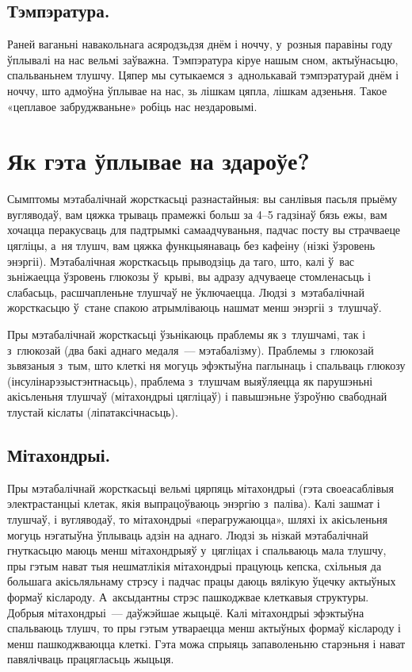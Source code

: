 
\subsection{Тэмпэратура.}
Раней ваганьні навакольнага асяродзьдзя днём і ноччу, у~розныя паравіны году ўплывалі на нас вельмі заўважна. Тэмпэратура кіруе нашым сном, актыўнасьцю, спальваньнем тлушчу. Цяпер мы сутыкаемся з~аднолькавай тэмпэратурай днём і ноччу, што адмоўна ўплывае на нас, зь лішкам цяпла, лішкам адзеньня. Такое «цеплавое забруджваньне» робіць нас нездаровымі.

\section{Як гэта ўплывае на здароўе?}

Сымптомы мэтабалічнай жорсткасьці разнастайныя: вы санлівыя пасьля прыёму вугляводаў, вам цяжка трываць прамежкі больш за 4--5 гадзінаў бязь ежы, вам хочацца перакусваць для падтрымкі самаадчуваньня, падчас посту вы страчваеце цягліцы, а~ня тлушч, вам цяжка функцыянаваць без кафеіну (нізкі ўзровень энэргіі). Мэтабалічная жорсткасьць прыводзіць да таго, што, калі ў~вас зьніжаецца ўзровень глюкозы ў~крыві, вы адразу адчуваеце стомленасьць і слабасьць, расшчапленьне тлушчаў не ўключаецца. Людзі з~мэтабалічнай жорсткасьцю ў~стане спакою атрымліваюць нашмат менш энэргіі з~тлушчаў.

Пры мэтабалічнай жорсткасьці ўзьнікаюць праблемы як з~тлушчамі, так і з~глюкозай (два бакі аднаго медаля~--- мэтабалізму). Праблемы з~глюкозай зьвязаныя з~тым, што клеткі ня могуць эфэктыўна паглынаць і спальваць глюкозу (інсулінарэзыстэнтнасьць), праблема з~тлушчам выяўляецца як парушэньні акісьленьня тлушчаў (мітахондрыі цягліцаў) і павышэньне ўзроўню свабоднай тлустай кіслаты (ліпатаксічнасьць).

\subsection{Мітахондрыі.}
Пры мэтабалічнай жорсткасьці вельмі цярпяць мітахондрыі (гэта своеасаблівыя электрастанцыі клетак, якія выпрацоўваюць энэргію з~паліва). Калі зашмат і тлушчаў, і вугляводаў, то мітахондрыі «перагружаюцца», шляхі іх акісьленьня могуць нэгатыўна ўплываць адзін на аднаго. Людзі зь нізкай мэтабалічнай гнуткасьцю маюць менш мітахондрыяў у~цягліцах і спальваюць мала тлушчу, пры гэтым нават тыя нешматлікія мітахондрыі працуюць кепска, схільныя да большага акісьляльнаму стрэсу і падчас працы даюць вялікую ўцечку актыўных формаў кіслароду. А~аксыдантны стрэс пашкоджвае клеткавыя структуры. Добрыя мітахондрыі~--- даўжэйшае жыцьцё. Калі мітахондрыі эфэктыўна спальваюць тлушч, то пры гэтым утвараецца менш актыўных формаў кіслароду і менш пашкоджваюцца клеткі. Гэта можа спрыяць запаволеньню старэньня і нават павялічваць працягласьць жыцьця.

